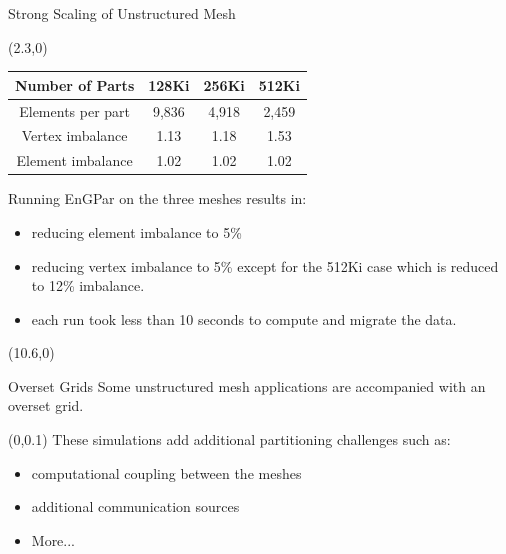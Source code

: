 \documentclass{beamer}
\begin{document}
\begin{textblock}{15.6}
\begin{textblock}{5}
\begin{block}{\centering Strong Scaling of Unstructured Mesh}
\begin{textblock}{2.3}
      \end{textblock}
      \begin{textblock}{2.5}(2.3,0)
      \begin{table}[!h]
        \centering
        \begin{tabular}{||c|c|c|c||}
          \hline
          Number of Parts &128Ki&256Ki&512Ki \\
          \hline
          Elements per part & 9,836 & 4,918&2,459  \\
          \hline
          Vertex imbalance & 1.13 & 1.18 & 1.53 \\
          \hline
          Element imbalance & 1.02& 1.02& 1.02\\
          \hline
        \end{tabular}
      \end{table}
      \end{textblock}
      \vspace{10cm}

      Running EnGPar on the three meshes results in:
      \begin{itemize}
      \item reducing element imbalance to 5\%
      \item reducing vertex imbalance to 5\% except for the 512Ki case which is reduced to 12\% imbalance.
      \item each run took less than 10 seconds to compute and migrate the data.
      \end{itemize}
      
      
    \end{block}
  \end{textblock}
  \begin{textblock}{5}(10.6,0)
    \begin{block}{\centering Overset Grids}
      Some unstructured mesh applications are accompanied with an overset grid.
      \begin{textblock}{2.7}(0,0.1)
        These simulations add additional partitioning challenges such as:
        \begin{itemize}
        \item computational coupling between the meshes
        \item additional communication sources
        \item More...
        \end{itemize}


\end{textblock}
\end{block}
\end{textblock}
\end{textblock}
\end{document}
